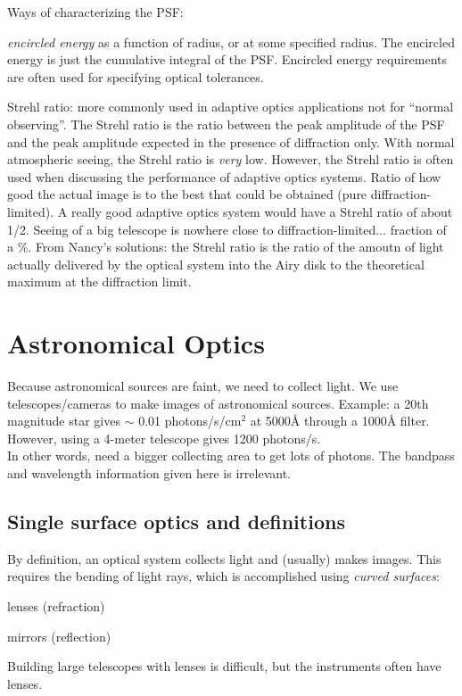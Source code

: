 \documentclass[12pt]{article}
\begin{document}
Ways of characterizing the PSF:
\begin{itemize*}
    \item \emph{encircled energy} as a function of radius,
        or at some specified radius. The encircled energy is just the
        cumulative integral of the PSF\@. Encircled energy requirements
        are often used for specifying optical tolerances.
    \item Strehl ratio: more commonly used in
        adaptive optics applications \textcolor{myBlue}{not for
        ``normal observing''}. The Strehl ratio is
        the ratio between the peak amplitude of the PSF and the peak amplitude
        expected in the presence of diffraction only. With normal atmospheric
        seeing, the Strehl ratio is \emph{very} low. However, the Strehl ratio is
        often used when discussing the performance of adaptive optics
        systems. \textcolor{myBlue}{Ratio of how good the actual image is to
        the best that could be obtained (pure diffraction-limited).
        A really good adaptive optics system would have a Strehl ratio
        of about 1/2. Seeing of a big telescope is nowhere close to
        diffraction-limited$\ldots$ fraction of a \%.}
        From Nancy's solutions: the Strehl ratio is the ratio of the
        amoutn of light actually delivered by the optical system into
        the Airy disk to the theoretical maximum at the diffraction limit.

\end{itemize*}



\newpage

\section*{Astronomical Optics}
Because astronomical sources are faint, we need to collect light.
We use telescopes/cameras to make images of astronomical sources.
Example: a 20th magnitude star gives $\sim$ 0.01 photons/s/cm$^2$ at
5000\AA{} through a 1000\AA{} filter.
However, using a 4-meter telescope gives 1200 photons/s.\\
\textcolor{myBlue}{In other words, need a bigger collecting area to
get lots of photons. The bandpass and wavelength information given
here is irrelevant}.

\subsection*{Single surface optics and definitions}
By definition, an optical system collects light
and (usually) makes images. This requires the bending
of light rays, which is accomplished using \emph{curved surfaces}:
\begin{itemize*}
    \item lenses (refraction)
    \item mirrors (reflection)
\end{itemize*}
Building large telescopes with lenses is difficult, but the
instruments often have lenses.
\end{document}
